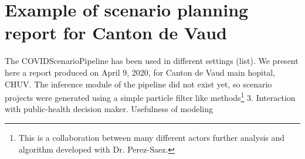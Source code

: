 \section{Example of scenario planning report for Canton de Vaud}
The COVIDScenarioPipeline has been used in different settings (list). We present here a report produced on April 9, 2020, for Canton de Vaud main hopital, CHUV. The inference module of the pipeline did not exist yet, so scenario projects were generated using a simple particle filter like methods\footnote{This is a collaboration between many different actors further analysis and algorithm developed with Dr. Perez-Saez.}
3. Interaction with public-health decision maker. Usefulness of modeling


 

